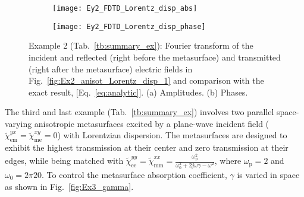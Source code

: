 \documentclass[journal]{IEEEtran}
\begin{document}
\begin{figure}
\centering
\begin{subfigure}{1\columnwidth}
  \centering
  \texttt{[image: Ey2\_FDTD\_Lorentz\_disp\_abs]}
\caption{}\label{fig:Ex2_anisot_Lorentz_disp_2}
\end{subfigure}

\begin{subfigure}{1\columnwidth}
  \centering
  \texttt{[image: Ey2\_FDTD\_Lorentz\_disp\_phase]}
 \caption{}\label{fig:Ex2_anisot_Lorentz_disp_3}
\end{subfigure}
\caption{Example 2 (Tab.~\ref{tb:summary_ex}): Fourier transform of the incident and reflected (right before the metasurface) and transmitted (right after the metasurface) electric fields in Fig.~\ref{fig:Ex2_anisot_Lorentz_disp_1} and comparison with the exact result, [Eq.~\eqref{eq:analytic}]. (a) Amplitudes. (b) Phases.}
\label{fig:Ex2_anisot_Lorentz_disp}
\end{figure}

The third and last example (Tab.~\ref{tb:summary_ex}) involves two parallel space-varying anisotropic metasurfaces excited by a plane-wave incident field ($\tilde{\chi}_\textrm{em}^{yx}=\tilde{\chi}_\textrm{me}^{xy}=0$) with Lorentzian dispersion. The metasurfaces are designed to exhibit the highest transmission at their center and zero transmission at their edges, while being matched with $\tilde{\chi}_\textrm{ee}^{yy}=\tilde{\chi}_\textrm{mm}^{xx}=\frac{\omega_\textrm{p}^2}{\omega_0^2+2j\omega\gamma-\omega^2}$, where $\omega_\textrm{p}=2$ and $\omega_0=2\pi20$. To control the metasurface absorption coefficient, $\gamma$ is varied in space as shown in Fig.~\ref{fig:Ex3_gamma}.
\end{document}
